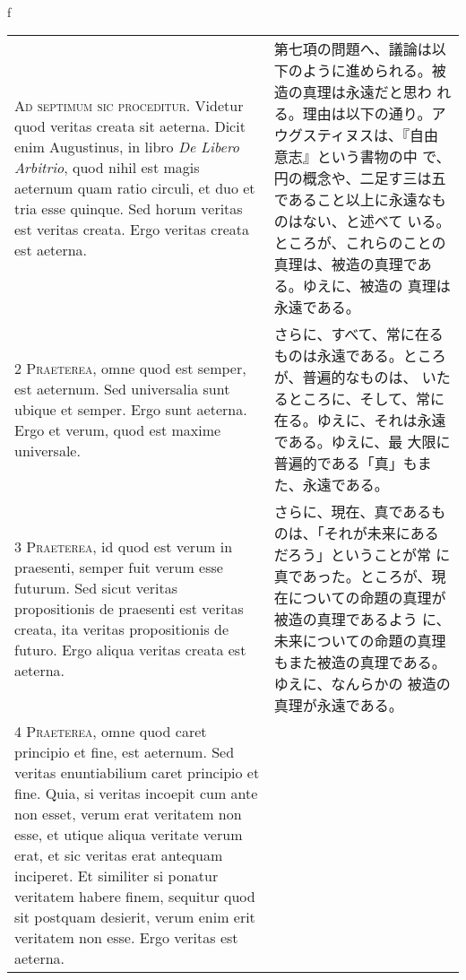 \\f\documentclass[10pt]{jsarticle} %
\begin{document}
\begin{longtable}{p{21em}p{21em}}

{\huge A}{\scshape d septimum sic proceditur}. Videtur quod veritas
creata sit aeterna. Dicit enim Augustinus, in libro {\itshape De
Libero Arbitrio}, quod nihil est magis aeternum quam ratio circuli, et
duo et tria esse quinque. Sed horum veritas est veritas creata. Ergo
veritas creata est aeterna.


&

第七項の問題へ、議論は以下のように進められる。被造の真理は永遠だと思わ
れる。理由は以下の通り。アウグスティヌスは、『自由意志』という書物の中
で、円の概念や、二足す三は五であること以上に永遠なものはない、と述べて
いる。ところが、これらのことの真理は、被造の真理である。ゆえに、被造の
真理は永遠である。

\\



{\scshape 2 Praeterea}, omne quod est semper, est aeternum. Sed
 universalia sunt ubique et semper. Ergo sunt aeterna. Ergo et verum,
 quod est maxime universale.


&

 さらに、すべて、常に在るものは永遠である。ところが、普遍的なものは、
いたるところに、そして、常に在る。ゆえに、それは永遠である。ゆえに、最
大限に普遍的である「真」もまた、永遠である。


\\

{\scshape 3 Praeterea}, id quod est verum in praesenti, semper fuit
verum esse futurum. Sed sicut veritas propositionis de praesenti est
veritas creata, ita veritas propositionis de futuro. Ergo aliqua
veritas creata est aeterna.


&

さらに、現在、真であるものは、「それが未来にあるだろう」ということが常
に真であった。ところが、現在についての命題の真理が被造の真理であるよう
に、未来についての命題の真理もまた被造の真理である。ゆえに、なんらかの
被造の真理が永遠である。

\\

{\scshape 4 Praeterea}, omne quod caret principio et fine, est
aeternum. Sed veritas enuntiabilium caret principio et fine. Quia, si
veritas incoepit cum ante non esset, verum erat veritatem non esse, et
utique aliqua veritate verum erat, et sic veritas erat antequam
inciperet. Et similiter si ponatur veritatem habere finem, sequitur
quod sit postquam desierit, verum enim erit veritatem non esse. Ergo
veritas est aeterna.



\end{longtable}
\end{document}
